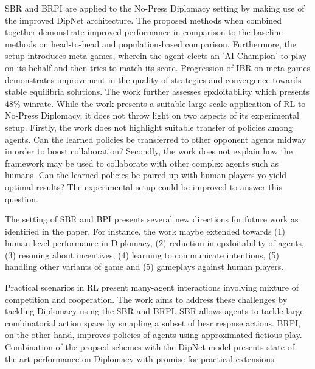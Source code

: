 \documentclass[11pt,letterpaper]{article}
\begin{document}
SBR and BRPI are applied to the No-Press Diplomacy setting by making use of the improved DipNet architecture. The proposed methods when combined together demonstrate improved performance in comparison to the baseline methods on head-to-head and population-based comparison. Furthermore, the setup introduces meta-games, wherein the agent elects an 'AI Champion' to play on its behalf and then tries to match its score. Progression of IBR on meta-games demonstrates improvement in the quality of strategies and convergence towards stable equilibria solutions. The work further assesses epxloitability which presents 48\% winrate. While the work presents a suitable large-scale application of RL to No-Press Diplomacy, it does not throw light on two aspects of its experimental setup. Firstly, the work does not highlight suitable transfer of policies among agents. Can the learned policies be transferred to other opponent agents midway in order to boost collaboration? Secondly, the work does not explain how the framework may be used to collaborate with other complex agents such as humans. Can the learned policies be paired-up with human players yo yield optimal results? The experimental setup could be improved to answer this question.

The setting of SBR and BPI presents several new directions for future work as identified in the paper. For instance, the work maybe extended towards (1) human-level performance in Diplomacy, (2) reduction in epxloitability of agents, (3) resoning about incentives, (4) learning to communicate intentions, (5) handling other variants of game and (5) gameplays against human players. 

Practical scenarios in RL present many-agent interactions involving mixture of competition and cooperation. The work aims to address these challenges by tackling Diplomacy using the SBR and BRPI. SBR allows agents to tackle large combinatorial action space by smapling a subset of besr respnse actions. BRPI, on the other hand, improves policies of agents using approximated fictious play. Combination of the propsed schemes with the DipNet model presents state-of-the-art performance on Diplomacy with promise for practical extensions. 
\end{document}
